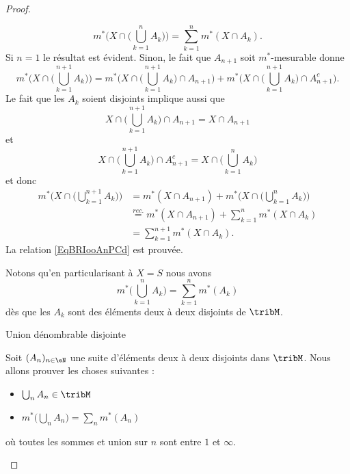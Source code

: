 \begin{proof}
\begin{subproof}
        \begin{equation}    \label{EqBRIooAnPCd}
            m^*\Big( X\cap\big( \bigcup_{k=1}^nA_k \big) \Big)=\sum_{k=1}^nm^*(X\cap A_k).
        \end{equation}
        Si \( n=1\) le résultat est évident. Sinon, le fait que \( A_{n+1}\) soit \( m^*\)-mesurable donne
        \begin{equation}
            m^*\Big( X\cap\big( \bigcup_{k=1}^{n+1}A_k \big) \Big)=m^*\Big( X\cap\big( \bigcup_{k=1}^{n+1}A_k \big)\cap A_{n+1} \Big)+m^*\Big( X\cap\big( \bigcup_{k=1}^{n+1}A_k \big)\cap A_{n+1}^c \Big).
        \end{equation}
        Le fait que les \( A_k\) soient disjoints implique aussi que
        \begin{equation}
            X\cap\big( \bigcup_{k=1}^{n+1}A_k \big)\cap A_{n+1}=X\cap A_{n+1}
        \end{equation}
        et
        \begin{equation}
            X\cap\big( \bigcup_{k=1}^{n+1}A_k \big)\cap A_{n+1}^c=X\cap\big( \bigcup_{k=1}^nA_k \big)
        \end{equation}
        et donc
        \begin{subequations}
            \begin{align}
                m^*\Big( X\cap\big( \bigcup_{k=1}^{n+1}A_k \big) \Big)&=m^*(X\cap A_{n+1})+m^*\Big( X\cap\big( \bigcup_{k=1}^nA_k \big) \Big)\\
                &\stackrel{rec.}{=}m^*(X\cap A_{n+1})+\sum_{k=1}^nm^*(X\cap A_k)\\
                &=\sum_{k=1}^{n+1}m^*(X\cap A_k).
            \end{align}
        \end{subequations}
        La relation \eqref{EqBRIooAnPCd} est prouvée.

        Notons qu'en particularisant à \( X=S\) nous avons 
        \begin{equation}
            m^*\big( \bigcup_{k=1}^nA_k \big)=\sum_{k=1}^nm^*(A_k)
        \end{equation}
        dès que les \( A_k\) sont des éléments deux à deux disjoints de \( \tribM\).
        
    \item[Union dénombrable disjointe]

        Soit \( (A_n)_{n\in \eN}\) une suite d'éléments deux à deux disjoints dans \( \tribM\). Nous allons prouver les choses suivantes :
        \begin{itemize}
            \item \( \bigcup_nA_n\in\tribM\)
            \item \( m^*\big( \bigcup_nA_n \big)=\sum_nm^*(A_n)\)
        \end{itemize}
        où toutes les sommes et union sur \( n\) sont entre \( 1\) et \( \infty\).


\end{subproof}
\end{proof}
